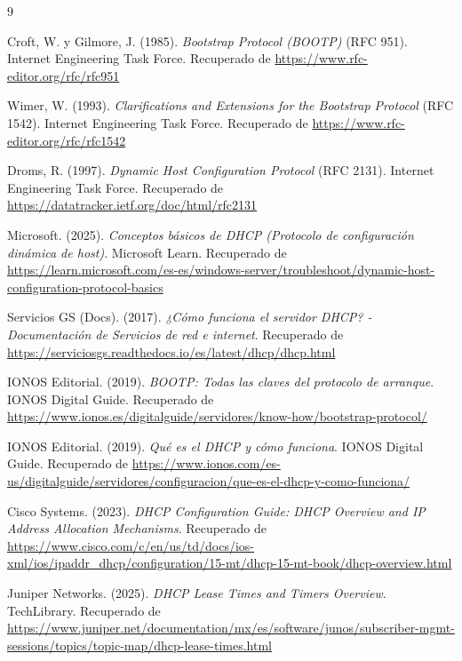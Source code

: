 \documentclass[a4paper,12pt]{article}
\begin{document}
\newpage

\begin{thebibliography}{9}
    
     Croft, W. y Gilmore, J. (1985). \textit{Bootstrap Protocol (BOOTP)} (RFC 951). Internet Engineering Task Force. Recuperado de \url{https://www.rfc-editor.org/rfc/rfc951}
    
     Wimer, W. (1993). \textit{Clarifications and Extensions for the Bootstrap Protocol} (RFC 1542). Internet Engineering Task Force. Recuperado de \url{https://www.rfc-editor.org/rfc/rfc1542}
    
     Droms, R. (1997). \textit{Dynamic Host Configuration Protocol} (RFC 2131). Internet Engineering Task Force. Recuperado de \url{https://datatracker.ietf.org/doc/html/rfc2131}
    
     Microsoft. (2025). \textit{Conceptos básicos de DHCP (Protocolo de configuración dinámica de host)}. Microsoft Learn. Recuperado de \url{https://learn.microsoft.com/es-es/windows-server/troubleshoot/dynamic-host-configuration-protocol-basics}
    
     Servicios GS (Docs). (2017). \textit{¿Cómo funciona el servidor DHCP? - Documentación de Servicios de red e internet}. Recuperado de \url{https://serviciosgs.readthedocs.io/es/latest/dhcp/dhcp.html}
    
     IONOS Editorial. (2019). \textit{BOOTP: Todas las claves del protocolo de arranque}. IONOS Digital Guide. Recuperado de \url{https://www.ionos.es/digitalguide/servidores/know-how/bootstrap-protocol/}
    
     IONOS Editorial. (2019). \textit{Qué es el DHCP y cómo funciona}. IONOS Digital Guide. Recuperado de \url{https://www.ionos.com/es-us/digitalguide/servidores/configuracion/que-es-el-dhcp-y-como-funciona/}
    
     Cisco Systems. (2023). \textit{DHCP Configuration Guide: DHCP Overview and IP Address Allocation Mechanisms}. Recuperado de \url{https://www.cisco.com/c/en/us/td/docs/ios-xml/ios/ipaddr_dhcp/configuration/15-mt/dhcp-15-mt-book/dhcp-overview.html}
    
     Juniper Networks. (2025). \textit{DHCP Lease Times and Timers Overview}. TechLibrary. Recuperado de \url{https://www.juniper.net/documentation/mx/es/software/junos/subscriber-mgmt-sessions/topics/topic-map/dhcp-lease-times.html}
    

\end{thebibliography}
\end{document}
